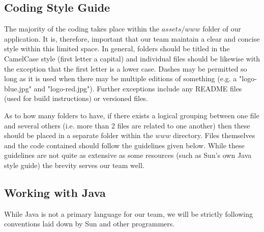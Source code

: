 \documentclass[12pt]{article}
\newenvironment{itemize*}%
  {\begin{itemize}%
  	\setlength{\parsep}{0pt}
    \setlength{\itemsep}{0pt}%
    \setlength{\parskip}{0pt}}%
  {\end{itemize}}
\begin{document}
\begin{itemize*}
\section{Coding Style Guide}
The majority of the coding takes place within the $assets/www$ folder of our application.  It is, therefore, important that our team maintain a clear and concise style within this limited space.  In general, folders should be titled in the CamelCase style (first letter a capital) and individual files should be likewise with the exception that the first letter is a lower case.  Dashes may be permitted so long as it is used when there may be multiple editions of something (e.g. a "logo-blue.jpg" and "logo-red.jpg").  Further exceptions include any README files (used for build instructions) or versioned files.  

As to how many folders to have, if there exists a logical grouping between one file and several others (i.e. more than 2 files are related to one another) then these should be placed in a separate folder within the $www$ directory.  Files themselves and the code contained should follow the guidelines given below.  While these guidelines are not quite as extensive as some resources (such as Sun's own Java style guide\cite{JavaStyle-Sun}) the brevity serves our team well.

\subsection{Working with Java}
While Java is not a primary language for our team, we will be strictly following conventions laid down by Sun and other programmers\cite{JavaStyle-Sun}\cite{JavaStyle-JavaRanch}.


\end{itemize*}
\end{document}
